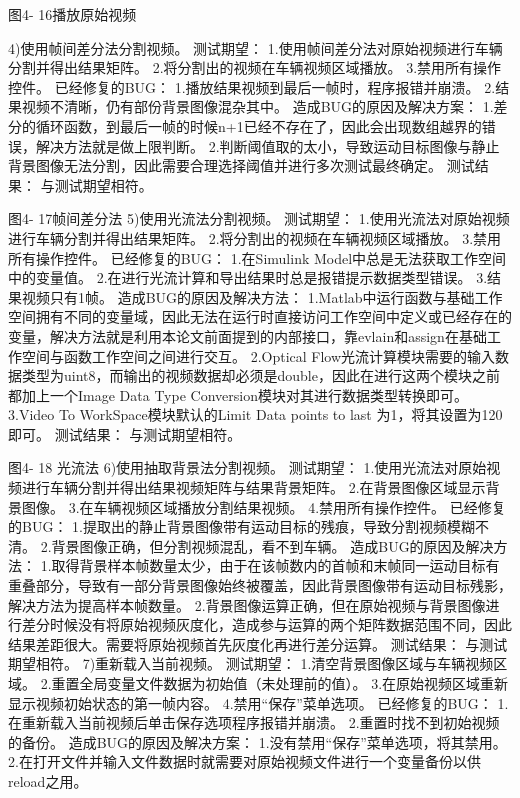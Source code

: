 \documentclass[18pt, twoside, a4paper, dvipdfm]{book}
\begin{document}
图4- 16播放原始视频

4)使用帧间差分法分割视频。
测试期望：
1.使用帧间差分法对原始视频进行车辆分割并得出结果矩阵。
2.将分割出的视频在车辆视频区域播放。
3.禁用所有操作控件。
已经修复的BUG：
1.播放结果视频到最后一帧时，程序报错并崩溃。
2.结果视频不清晰，仍有部份背景图像混杂其中。
造成BUG的原因及解决方案：
1.差分的循环函数，到最后一帧的时候n+1已经不存在了，因此会出现数组越界的错误，解决方法就是做上限判断。
2.判断阈值取的太小，导致运动目标图像与静止背景图像无法分割，因此需要合理选择阈值并进行多次测试最终确定。
测试结果：
	与测试期望相符。
 

图4- 17帧间差分法
5)使用光流法分割视频。
测试期望：
1.使用光流法对原始视频进行车辆分割并得出结果矩阵。
2.将分割出的视频在车辆视频区域播放。
3.禁用所有操作控件。
已经修复的BUG：
1.在Simulink Model中总是无法获取工作空间中的变量值。
2.在进行光流计算和导出结果时总是报错提示数据类型错误。
3.结果视频只有1帧。
造成BUG的原因及解决方法：
1.Matlab中运行函数与基础工作空间拥有不同的变量域，因此无法在运行时直接访问工作空间中定义或已经存在的变量，解决方法就是利用本论文前面提到的内部接口，靠evlain和assign在基础工作空间与函数工作空间之间进行交互。
2.Optical Flow光流计算模块需要的输入数据类型为uint8，而输出的视频数据却必须是double，因此在进行这两个模块之前都加上一个Image Data Type Conversion模块对其进行数据类型转换即可。
3.Video To WorkSpace模块默认的Limit Data points to last 为1，将其设置为120即可。
测试结果：
	与测试期望相符。
 

图4- 18 光流法
6)使用抽取背景法分割视频。
测试期望：
1.使用光流法对原始视频进行车辆分割并得出结果视频矩阵与结果背景矩阵。
2.在背景图像区域显示背景图像。
3.在车辆视频区域播放分割结果视频。
4.禁用所有操作控件。
已经修复的BUG：
1.提取出的静止背景图像带有运动目标的残痕，导致分割视频模糊不清。
2.背景图像正确，但分割视频混乱，看不到车辆。
造成BUG的原因及解决方法：
1.取得背景样本帧数量太少，由于在该帧数内的首帧和末帧同一运动目标有重叠部分，导致有一部分背景图像始终被覆盖，因此背景图像带有运动目标残影，解决方法为提高样本帧数量。
2.背景图像运算正确，但在原始视频与背景图像进行差分时候没有将原始视频灰度化，造成参与运算的两个矩阵数据范围不同，因此结果差距很大。需要将原始视频首先灰度化再进行差分运算。
测试结果：
	与测试期望相符。
7)重新载入当前视频。
测试期望：
1.清空背景图像区域与车辆视频区域。
2.重置全局变量文件数据为初始值（未处理前的值）。
3.在原始视频区域重新显示视频初始状态的第一帧内容。
4.禁用“保存”菜单选项。
已经修复的BUG：
1.在重新载入当前视频后单击保存选项程序报错并崩溃。
2.重置时找不到初始视频的备份。
造成BUG的原因及解决方案：
1.没有禁用“保存”菜单选项，将其禁用。
2.在打开文件并输入文件数据时就需要对原始视频文件进行一个变量备份以供reload之用。
\end{document}

